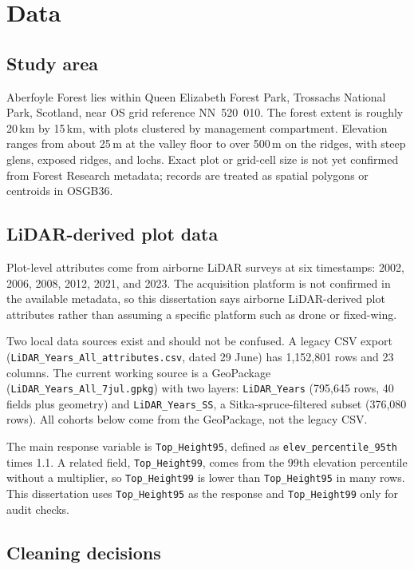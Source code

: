 \chapter{Data}
\label{ch:data}

\section{Study area}

Aberfoyle Forest lies within Queen Elizabeth Forest Park, Trossachs National Park, Scotland, near OS grid reference NN~520~010. The forest extent is roughly 20\,km by 15\,km, with plots clustered by management compartment. Elevation ranges from about 25\,m at the valley floor to over 500\,m on the ridges, with steep glens, exposed ridges, and lochs. Exact plot or grid-cell size is not yet confirmed from Forest Research metadata; records are treated as spatial polygons or centroids in OSGB36.

\section{LiDAR-derived plot data}
\label{sec:data-lidar}

Plot-level attributes come from airborne LiDAR surveys at six timestamps: 2002, 2006, 2008, 2012, 2021, and 2023. The acquisition platform is not confirmed in the available metadata, so this dissertation says airborne LiDAR-derived plot attributes rather than assuming a specific platform such as drone or fixed-wing.

Two local data sources exist and should not be confused. A legacy CSV export (\texttt{LiDAR\_Years\_All\_attributes.csv}, dated 29 June) has 1,152,801 rows and 23 columns. The current working source is a GeoPackage (\texttt{LiDAR\_Years\_All\_7jul.gpkg}) with two layers: \texttt{LiDAR\_Years} (795,645 rows, 40 fields plus geometry) and \texttt{LiDAR\_Years\_SS}, a Sitka-spruce-filtered subset (376,080 rows). All cohorts below come from the GeoPackage, not the legacy CSV.

The main response variable is \texttt{Top\_Height95}, defined as \texttt{elev\_percentile\_95th} times 1.1. A related field, \texttt{Top\_Height99}, comes from the 99th elevation percentile without a multiplier, so \texttt{Top\_Height99} is lower than \texttt{Top\_Height95} in many rows. This dissertation uses \texttt{Top\_Height95} as the response and \texttt{Top\_Height99} only for audit checks.

\section{Cleaning decisions}

